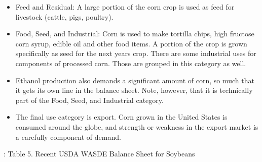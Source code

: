 \documentclass[
]{book}
\providecommand{\tightlist}{%
  \setlength{\itemsep}{0pt}\setlength{\parskip}{0pt}}
\begin{document}
\begin{itemize}
\tightlist
\item
  Feed and Residual: A large portion of the corn crop is used as feed for livestock (cattle, pigs, poultry).
\item
  Food, Seed, and Industrial: Corn is used to make tortilla chips, high fructose corn syrup, edible oil and other food items. A portion of the crop is grown specifically as seed for the next years crop. There are some industrial uses for components of processed corn. Those are grouped in this category as well.
\item
  Ethanol production also demands a significant amount of corn, so much that it gets its own line in the balance sheet. Note, however, that it is technically part of the Food, Seed, and Industrial category.
\item
  The final use category is export. Corn grown in the United States is consumed around the globe, and strength or weakness in the export market is a carefully component of demand.
\end{itemize}

: Table 5. Recent USDA WASDE Balance Sheet for Soybeans
\end{document}
